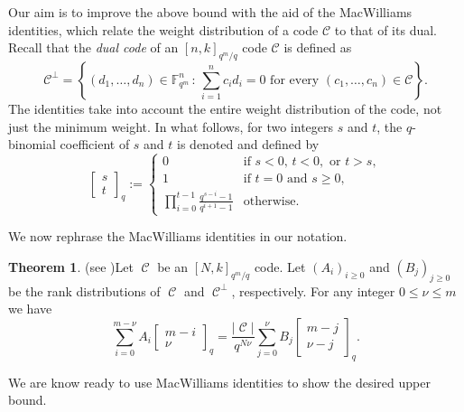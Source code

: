 \documentclass[11pt]{amsart}
\DeclareMathOperator{\C}{\mathcal{C}}
\theoremstyle{definition}
\newtheorem{theorem}{Theorem}[section]
\newcommand\qbin[3]{\left[\begin{matrix} #1 \\ #2 \end{matrix} \right]_{#3}}
\begin{document}
Our aim is to improve the above bound with the aid of the MacWilliams identities, which relate the weight distribution of a code $\mathcal{C}$ to that of its dual. Recall that the \emph{dual code} of an \( [n,k]_{q^m/q} \) code \( \mathcal{C} \) is defined as
\[
\mathcal{C}^\perp = \left\{ (d_1,\ldots,d_n) \in \mathbb{F}_{q^m}^n \, \colon \, \sum_{i=1}^n c_i d_i = 0 \text{ for every } (c_1,\ldots,c_n) \in \mathcal{C} \right\}.
\]
The identities take into account the entire weight distribution of the code, not just the minimum weight. In what follows, for two integers $s$ and $t$, the $q$-binomial coefficient of $s$ and $t$ is denoted and defined by
\[
\qbin{s}{t}{q} := 
\begin{cases}
    0 & \text{if } s < 0,\, t < 0, \text{ or } t > s, \\
    1 & \text{if } t = 0 \text{ and } s \geq 0, \\
    \prod\limits_{i=0}^{t-1} \frac{q^{s-i} - 1}{q^{i+1} - 1} & \text{otherwise}.
\end{cases}
\]

We now rephrase the MacWilliams identities in our notation.


\begin{theorem}(see \cite[Theorem 31]{ravagnani2016rank})\label{thm:MWident}
    Let $\C$ be an $[N,k]_{q^m/q}$ code. Let $(A_i)_{i \geq 0}$ and $(B_j)_{j \geq 0}$ be the rank distributions of $\C$ and $\C^\perp$, respectively. For any integer $0\leq \nu \leq m$ we have
    \[ \sum_{i=0}^{m-\nu} A_i \qbin{m-i}{\nu}{q}=\frac{|\C|}{q^{N\nu}}\sum_{j=0}^\nu B_j\qbin{m-j}{\nu-j}{q}. \]
\end{theorem}

We are know ready to use MacWilliams identities to show the desired upper bound.
\end{document}
